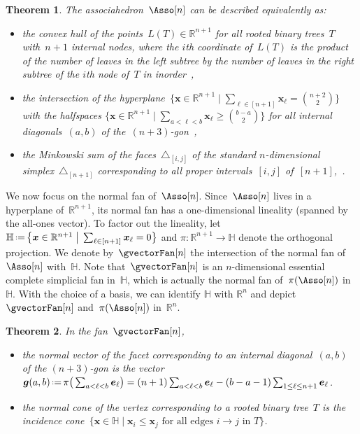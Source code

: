 \documentclass{amsart}
\newtheorem{theorem}{Theorem}[section]
\theoremstyle{definition}
\newcommand{\R}{\mathbb{R}} %
\newcommand{\HH}{\mathbb{H}} %
\renewcommand{\b}[1]{{\boldsymbol{#1}}} %
\newcommand{\bigset}[2]{\big\{ #1 \;\big|\; #2 \big\}} %
\newcommand{\eqdef}{\mbox{\,\raisebox{0.2ex}{\scriptsize\ensuremath{\mathrm:}}\ensuremath{=}\,}} %
\newcommand{\simplex}{\triangle} %
\newcommand{\gvector}[1]{\b{g}(#1)} %
\begin{document}
\begin{theorem}
\label{thm:associahedronLoday}
The associahedron~$\Asso[n]$ can be described equivalently as:
\begin{itemize}
\item the convex hull of the points~$L(T) \in \R^{n+1}$ for all rooted binary trees~$T$ with~$n+1$ internal nodes, where the $i$th coordinate of~$L(T)$ is the product of the number of leaves in the left subtree by the number of leaves in the right subtree of the $i$th node of~$T$ in inorder~\cite{Loday},
\item the intersection of the hyperplane~$\bigset{\b{x} \in \R^{n+1}}{\sum_{\ell \in [n+1]} \b{x}_\ell = \binom{n+2}{2}}$ with the halfspaces $\bigset{\b{x} \in \R^{n+1}}{\sum_{a < \ell < b} \b{x}_\ell \ge \binom{b-a}{2}}$ for all internal diagonals~$(a,b)$ of \mbox{the $(n+3)$-gon~\cite{ShniderSternberg}},
\item the Minkowski sum of the faces~$\simplex_{[i,j]}$ of the standard $n$-dimensional simplex~$\simplex_{[n+1]}$ corresponding to all proper intervals~$[i,j]$ of~$[n+1]$,~\cite{Postnikov}.
\end{itemize}
\end{theorem}

We now focus on the normal fan of~$\Asso[n]$.
Since~$\Asso[n]$ lives in a hyperplane of~$\R^{n+1}$, its normal fan has a one-dimensional lineality (spanned by the all-ones vector).
To factor out the lineality, let~$\HH \eqdef \bigset{\b{x} \in \R^{n+1}}{\sum_{\ell \in [n+1]} \b{x}_\ell = 0}$ and ${\pi : \R^{n+1} \to \HH}$ denote the orthogonal projection.
We denote by~$\gvectorFan[n]$ the intersection of the normal fan of~$\Asso[n]$ with~$\HH$. 
Note that~$\gvectorFan[n]$ is an $n$-dimensional essential complete simplicial fan in~$\HH$, which is actually the normal fan of~$\pi(\Asso[n])$ in~$\HH$. 
With the choice of a basis, we can identify $\HH$ with $\R^n$ and depict~$\gvectorFan[n]$ and~$\pi(\Asso[n])$ in~$\R^n$.

\begin{theorem}
\label{thm:normalFanLoday}
In the fan~$\gvectorFan[n]$, 
\begin{itemize}
\item the normal vector of the facet corresponding to an internal diagonal~$(a,b)$ of the $(n+3)$-gon is the vector~$\gvector{a,b} \eqdef \pi\big( \sum_{a < \ell < b} \b{e}_\ell \big) = (n+1) \sum_{a < \ell < b} \b{e}_\ell - (b-a-1) \sum_{1 \le \ell \le n+1} \b{e}_\ell$.
\item the normal cone of the vertex corresponding to a rooted binary tree~$T$ is the incidence cone~$\bigset{\b{x} \in \HH}{\b{x}_i \le \b{x}_j \text{ for all edges $i \to j$ in $T$}}$.
\end{itemize}
\end{theorem}
\end{document}
